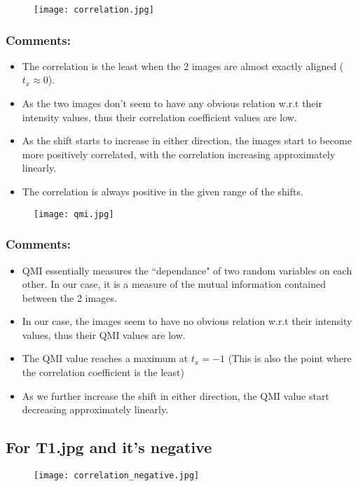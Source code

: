 \documentclass[11pt, fleqn]{article}
\begin{document}
\begin{figure}[H]
    \centering
    \texttt{[image: correlation.jpg]}
    \label{q6ic}
\end{figure}

\subsubsection*{Comments:}
\begin{itemize}
    \item The correlation is the least when the 2 images are almost exactly aligned ($t_x \approx 0$).
    \item As the two images don't seem to have any obvious relation w.r.t their intensity values, thus their correlation coefficient values are low.
    \item As the shift starts to increase in either direction, the images start to become more positively correlated, with the correlation increasing approximately linearly.
    \item The correlation is always positive in the given range of the shifts.
\end{itemize}

\newpage
\begin{figure}[H]
    \centering
    \texttt{[image: qmi.jpg]}
    \label{q6ic}
\end{figure}
\subsubsection*{Comments:}
\begin{itemize}
    \item QMI essentially measures the ``dependance" of two random variables on each other. In our case, it is a measure of the mutual information contained between the 2 images.
    \item In our case, the images seem to have no obvious relation  w.r.t their intensity values, thus their QMI values are low.
    \item The QMI value reaches a maximum at $t_x=-1$ (This is also the point where the correlation coefficient is the least)
    \item As we further increase the shift in either direction, the QMI value start decreasing approximately linearly.
\end{itemize}

\newpage
\subsection*{\Large For T1.jpg and it's negative}
\begin{figure}[H]
    \centering
    \texttt{[image: correlation\_negative.jpg]}
    \label{q6ic}
\end{figure}
\end{document}
